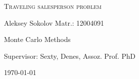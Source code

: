 \label{sec:Titelblatt}

\begin{titlepage}
    \centering
    \vspace{6cm}
    {\scshape\Large Traveling salesperson problem \par}
    \vspace{3cm}
    {\Large Aleksey Sokolov Matr.: 12004091 \par}
    \vspace{2cm}
    
    \vfill
    {\large Monte Carlo Methods \par}
    {\large Supervisor: Sexty, Denes, Assoz. Prof. PhD}
    
    {\large \today\par} 
\end{titlepage}